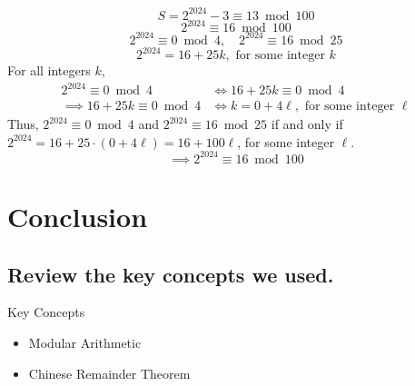 \documentclass{beamer} %
\begin{document}
\begin{frame}{}
\[
S = 2^{2024} - 3 \equiv \boxed{13} \bmod 100
\]
\[
2^{2024} \equiv 16 \bmod 100
\]
\[
2^{2024} \equiv 0 \bmod 4, \quad 2^{2024} \equiv 16 \bmod 25
\]
\[
2^{2024} = 16 + 25k, \text{ for some integer } k
\]
For all integers $k$,
\begin{align*}
2^{2024} \equiv 0 \bmod 4 &\iff 16 + 25k \equiv 0 \bmod 4\\
\implies 16 + 25k \equiv 0 \bmod 4 &\iff k = 0 + 4\ell, \text{ for some integer } \ell
\end{align*}
Thus, $2^{2024} \equiv 0 \bmod 4$ and $2^{2024} \equiv 16 \bmod 25$ if and only if $2^{2024} = 16 + 25 \cdot (0 + 4 \ell) = 16 + 100\ell$, for some integer $\ell$.
\[
\implies 2^{2024} \equiv 16 \bmod 100
\]
\end{frame}

\setcounter{equation}{0}

\section{Conclusion}

\subsection*{Review the key concepts we used.}

\begin{frame}{Key Concepts}
  \begin{itemize}
  \item Modular Arithmetic
  \item Chinese Remainder Theorem
  \end{itemize}
\end{frame}
\end{document}
